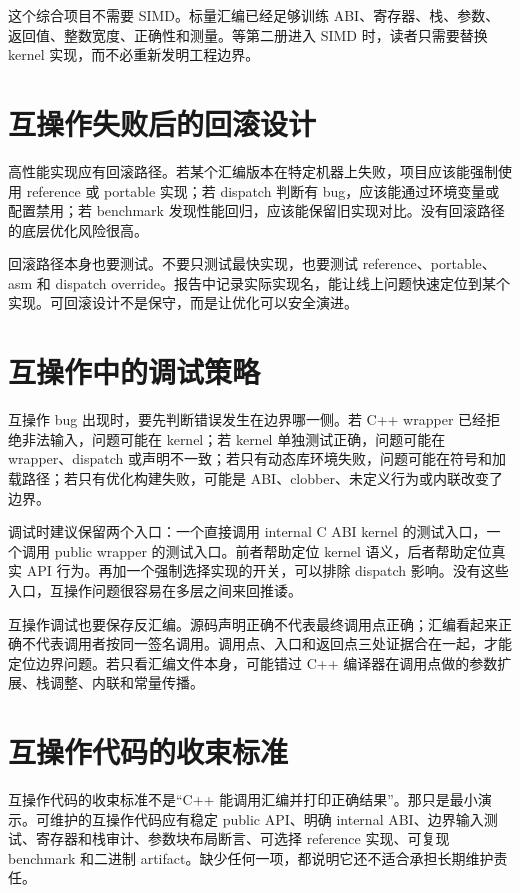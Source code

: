这个综合项目不需要 SIMD。标量汇编已经足够训练 ABI、寄存器、栈、参数、返回值、整数宽度、正确性和测量。等第二册进入 SIMD 时，读者只需要替换 kernel 实现，而不必重新发明工程边界。

\section{互操作失败后的回滚设计}

高性能实现应有回滚路径。若某个汇编版本在特定机器上失败，项目应该能强制使用 reference 或 portable 实现；若 dispatch 判断有 bug，应该能通过环境变量或配置禁用；若 benchmark 发现性能回归，应该能保留旧实现对比。没有回滚路径的底层优化风险很高。

回滚路径本身也要测试。不要只测试最快实现，也要测试 reference、portable、asm 和 dispatch override。报告中记录实际实现名，能让线上问题快速定位到某个实现。可回滚设计不是保守，而是让优化可以安全演进。

\section{互操作中的调试策略}

互操作 bug 出现时，要先判断错误发生在边界哪一侧。若 C++ wrapper 已经拒绝非法输入，问题可能在 kernel；若 kernel 单独测试正确，问题可能在 wrapper、dispatch 或声明不一致；若只有动态库环境失败，问题可能在符号和加载路径；若只有优化构建失败，可能是 ABI、clobber、未定义行为或内联改变了边界。

调试时建议保留两个入口：一个直接调用 internal C ABI kernel 的测试入口，一个调用 public wrapper 的测试入口。前者帮助定位 kernel 语义，后者帮助定位真实 API 行为。再加一个强制选择实现的开关，可以排除 dispatch 影响。没有这些入口，互操作问题很容易在多层之间来回推诿。

互操作调试也要保存反汇编。源码声明正确不代表最终调用点正确；汇编看起来正确不代表调用者按同一签名调用。调用点、入口和返回点三处证据合在一起，才能定位边界问题。若只看汇编文件本身，可能错过 C++ 编译器在调用点做的参数扩展、栈调整、内联和常量传播。

\section{互操作代码的收束标准}

互操作代码的收束标准不是“C++ 能调用汇编并打印正确结果”。那只是最小演示。可维护的互操作代码应有稳定 public API、明确 internal ABI、边界输入测试、寄存器和栈审计、参数块布局断言、可选择 reference 实现、可复现 benchmark 和二进制 artifact。缺少任何一项，都说明它还不适合承担长期维护责任。

